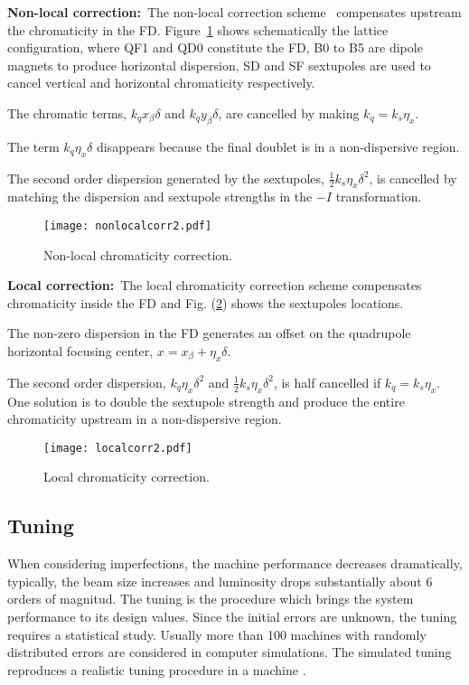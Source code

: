 %
\textbf{Non-local correction:}~The non-local correction scheme~\cite{Brown:1988} compensates upstream the chromaticity in the FD. Figure~\ref{f-Non-local} shows schematically the lattice configuration, where QF1 and QD0 constitute the FD, B0 to B5 are dipole magnets to produce horizontal dispersion, SD and SF sextupoles are used to cancel vertical and horizontal chromaticity respectively.\par
The chromatic terms, $k_q x_\beta\delta$ and $k_q y_\beta\delta$, are cancelled by making $k_q=k_s\eta_x$.\par
The term $k_q\eta_x\delta$ disappears because the final doublet is in a non-dispersive region.\par
The second order dispersion generated by the sextupoles, $\frac{1}{2}k_s\eta_x\delta^2$, is cancelled by matching the dispersion and sextupole strengths in the $-I$ transformation.
\begin{figure}[h]
   \centering
   \texttt{[image: nonlocalcorr2.pdf]}
   \caption{Non-local chromaticity correction.}
   \label{f-Non-local}
\end{figure}\par
\textbf{Local correction:}~The local chromaticity correction scheme \cite{Raimondi:2000} compensates chromaticity inside the FD and Fig. (\ref{f-local}) shows the sextupoles locations.\par
The non-zero dispersion in the FD generates an offset on the quadrupole horizontal focusing center, $x=x_\beta+\eta_x\delta$.\par
The second order dispersion, $k_q\eta_x\delta^2$ and $\frac{1}{2}k_s\eta_x\delta^2$, is half cancelled if $k_q=k_s\eta_x$. One solution is to double the sextupole strength and produce the entire chromaticity upstream in a non-dispersive region.\par
\begin{figure}[!htb]
   \centering
   \texttt{[image: localcorr2.pdf]}
   \caption{Local chromaticity correction.}
   \label{f-local}
\end{figure}
\subsection{Tuning}
When considering imperfections, the machine performance decreases dramatically, typically, the beam size increases and luminosity drops substantially about 6 orders of magnitud. The tuning is the procedure which brings the system performance to its design values. Since the initial errors are unknown, the tuning requires a statistical study. Usually more than 100 machines with randomly distributed errors are considered in computer simulations. The simulated tuning reproduces a realistic tuning procedure in a machine \cite{GarciaMorales:1982827,Minty:629879}.\par
